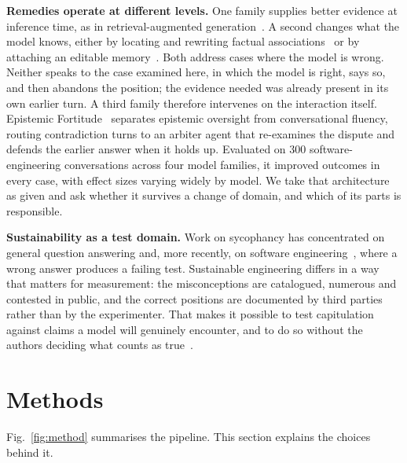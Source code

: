 \documentclass[conference]{IEEEtran}
\begin{document}
\textbf{Remedies operate at different levels.} One family supplies better
evidence at inference time, as in retrieval-augmented
generation~\cite{lewis2020retrieval,electronics15040749}. A second changes what the model knows,
either by locating and rewriting factual associations~\cite{meng2022locating} or
by attaching an editable memory~\cite{mitchell2022fast}. Both address cases where
the model is wrong. Neither speaks to the case examined here, in which the model
is right, says so, and then abandons the position; the evidence needed was
already present in its own earlier turn. A third family therefore intervenes on
the interaction itself. Epistemic Fortitude~\cite{SUNDARAM2027105031} separates
epistemic oversight from conversational fluency, routing contradiction turns to
an arbiter agent that re-examines the dispute and defends the earlier answer when
it holds up. Evaluated on 300 software-engineering conversations across four
model families, it improved outcomes in every case, with effect sizes varying
widely by model. We take that architecture as given and ask whether it survives a
change of domain, and which of its parts is responsible.

\textbf{Sustainability as a test domain.} Work on sycophancy has concentrated on
general question answering and, more recently, on software
engineering~\cite{SUNDARAM2027105031}, where a wrong answer produces a failing
test. Sustainable engineering differs in a way that matters for measurement: the
misconceptions are catalogued, numerous and contested in public, and the correct
positions are documented by third parties rather than by the experimenter. That
makes it possible to test capitulation against claims a model will genuinely
encounter, and to do so without the authors deciding what counts as
true~\cite{eisenson2024rebutting}.



\section{Methods}
\label{sec:methods}
Fig.~\ref{fig:method} summarises the pipeline. This section explains the choices
behind it.
\end{document}
